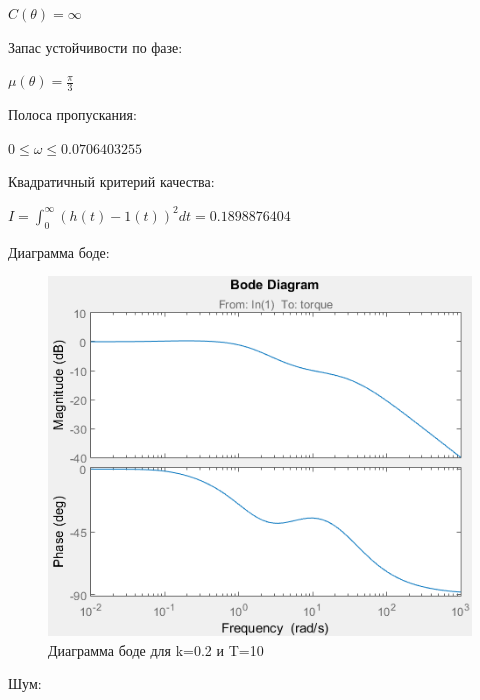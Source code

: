 \documentclass[14pt,a4paper,report]{report}
\begin{document}
\begin{center}
$C(\theta)=\infty$
\end{center}

Запас устойчивости по фазе:

\begin{center}
$\mu(\theta)=\frac{\pi}{3}$
\end{center}

Полоса пропускания:

\begin{center}
$0\leq\omega\leq0.0706403255$
\end{center}

Квадратичный критерий качества:

\begin{center}
$I=\int_{0}^{\infty}(h(t)-1(t))^2dt=0.1898876404$
\end{center}

Диаграмма боде:

\begin{figure}[h!]
	\centering
	\includegraphics[scale = 0.76]{images/bode10.png}
	\caption{Диаграмма боде для k=0.2 и T=10}
	\label{image:2}
\end{figure}

Шум:
\end{document}
